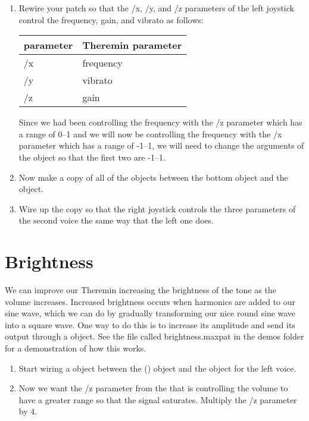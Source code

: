 \begin{enumerate}
\item Rewire your patch so that the /x, /y, and /z parameters of the left joystick control the frequency, 
gain, and vibrato as follows:

\begin{center}
  \begin{tabular}{|l|l|}
    \hline
    \gt{} parameter & Theremin parameter\\
    \hline
    \hline
    /x & frequency\\
    \hline
    /y & vibrato\\
    \hline
    /z & gain\\
    \hline
  \end{tabular}
\end{center}

Since we had been controlling the frequency with the /z parameter which has a range
of 0--1 and we will now be controlling the frequency with the /x parameter which 
has a range of -1--1, we will need to change the arguments of the  object
so that the first two are -1--1.

\item Now make a copy of all of the objects between the bottom  object 
and the  object.


\item Wire up the copy so that the right joystick controls the three parameters of the 
second voice the same way that the left one does. 

\end{enumerate}

\section{Brightness}\label{brightness}

We can improve our Theremin increasing the brightness of the tone as the volume increases.  
Increased brightness occurs when harmonics are added to our sine wave, which we can do by gradually 
transforming our nice round sine wave into a square wave.  One way to do this is to increase its
amplitude and send its output through a  object.  
See the file called brightness.maxpat in the demos folder for a demonstration of how this works.  

\begin{enumerate}

\item Start wiring a  object between the \msp{*}{} () object and the 
 object for the left voice.

\item Now we want the /z parameter from the \gt{} that is controlling the volume to have
a greater range so that the signal saturates.  Multiply the /z parameter by 4.


\end{enumerate}

